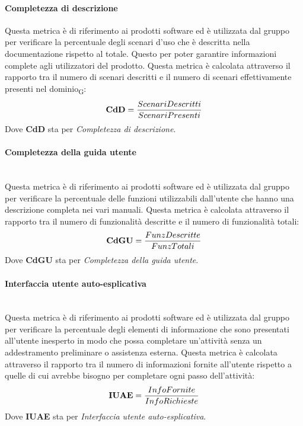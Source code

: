 \paragraph{Completezza di descrizione}\mbox\\
Questa metrica è di riferimento ai prodotti software ed è utilizzata dal gruppo per verificare la percentuale degli scenari d’uso che è descritta nella documentazione rispetto al totale. Questo per poter garantire informazioni complete agli utilizzatori del prodotto. Questa metrica è calcolata attraverso il rapporto tra il numero di scenari descritti e il numero di scenari effettivamente presenti nel dominio\textsubscript{G}:
\begin{align*}
	\centering
	\textbf{CdD} = \frac{ScenariDescritti}{ScenariPresenti}
\end{align*}
Dove \textbf{CdD} sta per \textit{Completezza di descrizione}.
\paragraph{Completezza della guida utente}\mbox{}\\
Questa metrica è di riferimento ai prodotti software ed è utilizzata dal gruppo per verificare la percentuale delle funzioni utilizzabili dall'utente che hanno una descrizione completa nei vari manuali. Questa metrica è calcolata attraverso il rapporto tra il numero di funzionalità descritte e il numero di funzionalità totali:
\begin{align*}
	\centering
	\textbf{CdGU} = \frac{FunzDescritte}{FunzTotali}
\end{align*}
Dove \textbf{CdGU} sta per \textit{Completezza della guida utente}.
\paragraph{Interfaccia utente auto-esplicativa}\mbox{}\\
Questa metrica è di riferimento ai prodotti software ed è utilizzata dal gruppo per verificare la percentuale degli elementi di informazione che sono presentati all’utente inesperto in modo che possa completare un’attività senza un addestramento preliminare o assistenza esterna. Questa metrica è calcolata attraverso il rapporto tra il numero di informazioni fornite all'utente rispetto a quelle di cui avrebbe bisogno per completare ogni passo dell'attività:
\begin{align*}
	\centering
	\textbf{IUAE} = \frac{InfoFornite}{InfoRichieste}
\end{align*}
Dove \textbf{IUAE} sta per \textit{Interfaccia utente auto-esplicativa}.
